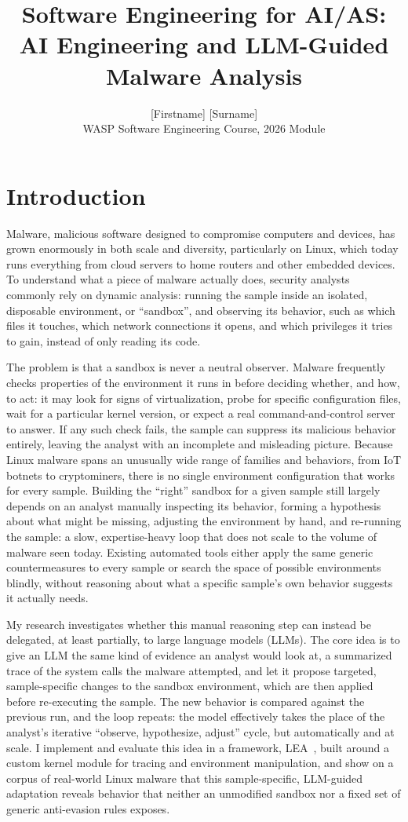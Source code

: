 \documentclass[11pt,a4paper]{article}
\title{Software Engineering for AI/AS: \\ AI Engineering and LLM-Guided Malware Analysis}
\author{[Firstname] [Surname] \\ \small WASP Software Engineering Course, 2026 Module}
\date{}
\begin{document}
\maketitle
\thispagestyle{empty}

\section{Introduction}

Malware, malicious software designed to compromise computers and devices, has grown enormously in both scale and diversity, particularly on Linux, which today runs everything from cloud servers to home routers and other embedded devices.
To understand what a piece of malware actually does, security analysts commonly rely on dynamic analysis: running the sample inside an isolated, disposable environment, or ``sandbox'', and observing its behavior, such as which files it touches, which network connections it opens, and which privileges it tries to gain, instead of only reading its code.

The problem is that a sandbox is never a neutral observer.
Malware frequently checks properties of the environment it runs in before deciding whether, and how, to act: it may look for signs of virtualization, probe for specific configuration files, wait for a particular kernel version, or expect a real command-and-control server to answer.
If any such check fails, the sample can suppress its malicious behavior entirely, leaving the analyst with an incomplete and misleading picture.
Because Linux malware spans an unusually wide range of families and behaviors, from IoT botnets to cryptominers, there is no single environment configuration that works for every sample.
Building the ``right'' sandbox for a given sample still largely depends on an analyst manually inspecting its behavior, forming a hypothesis about what might be missing, adjusting the environment by hand, and re-running the sample: a slow, expertise-heavy loop that does not scale to the volume of malware seen today.
Existing automated tools either apply the same generic countermeasures to every sample or search the space of possible environments blindly, without reasoning about what a specific sample's own behavior suggests it actually needs.

My research investigates whether this manual reasoning step can instead be delegated, at least partially, to large language models (LLMs).
The core idea is to give an LLM the same kind of evidence an analyst would look at, a summarized trace of the system calls the malware attempted, and let it propose targeted, sample-specific changes to the sandbox environment, which are then applied before re-executing the sample.
The new behavior is compared against the previous run, and the loop repeats: the model effectively takes the place of the analyst's iterative ``observe, hypothesize, adjust'' cycle, but automatically and at scale.
I implement and evaluate this idea in a framework, LEA~\cite{lea2026}, built around a custom kernel module for tracing and environment manipulation, and show on a corpus of real-world Linux malware that this sample-specific, LLM-guided adaptation reveals behavior that neither an unmodified sandbox nor a fixed set of generic anti-evasion rules exposes.
\end{document}
